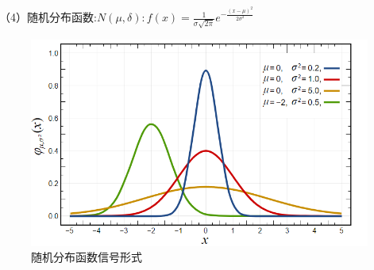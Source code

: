 \documentclass[UTF8]{ctexart}
\begin{document}
（4）随机分布函数:$N(\mu ,\delta ): f(x)=\frac{1}{\sigma \sqrt{2\pi }} e^{-\frac{(x-\mu )^2}{2\sigma ^2} } $ \par
\begin{figure}[h]
    \centering         %
    \includegraphics[scale=0.35]{4.jpg}
    \caption{随机分布函数信号形式}
\end{figure}
\end{document}
